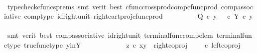 \begin{isabellebody}
\ \ \ \ \ \ \ \ \isamarkupfalse%
\ {\isacharparenleft}{\kern0pt}typecheck{\isacharunderscore}{\kern0pt}cfuncs{\isacharunderscore}{\kern0pt}prems{\isacharcomma}{\kern0pt}\ smt\ {\isacharparenleft}{\kern0pt}verit{\isacharcomma}{\kern0pt}\ best{\isacharparenright}{\kern0pt}\ cfunc{\isacharunderscore}{\kern0pt}cross{\isacharunderscore}{\kern0pt}prod{\isacharunderscore}{\kern0pt}comp{\isacharunderscore}{\kern0pt}cfunc{\isacharunderscore}{\kern0pt}prod\ comp{\isacharunderscore}{\kern0pt}associative{}\ comp{\isacharunderscore}{\kern0pt}type\ id{\isacharunderscore}{\kern0pt}right{\isacharunderscore}{\kern0pt}unit{}\ right{\isacharunderscore}{\kern0pt}cart{\isacharunderscore}{\kern0pt}proj{\isacharunderscore}{\kern0pt}cfunc{\isacharunderscore}{\kern0pt}prod{\isacharparenright}{\kern0pt}\isanewline
\ \ \ \ \ \ \isamarkupfalse%
\ \isamarkupfalse%
\ {\isachardoublequoteopen}Q\ {\isasymcirc}\isactrlsub c\ y\ {\isacharequal}{\kern0pt}\ {\isacharparenleft}{\kern0pt}{\isasymt}\ {\isasymcirc}\isactrlsub c\ {\isasymbeta}\isactrlbsub Y\isactrlesub {\isacharparenright}{\kern0pt}\ {\isasymcirc}\isactrlsub c\ y{\isachardoublequoteclose}\isanewline
\ \ \ \ \ \ \ \ \isamarkupfalse%
\ {\isacharparenleft}{\kern0pt}smt\ {\isacharparenleft}{\kern0pt}verit{\isacharcomma}{\kern0pt}\ best{\isacharparenright}{\kern0pt}\ comp{\isacharunderscore}{\kern0pt}associative{}\ id{\isacharunderscore}{\kern0pt}right{\isacharunderscore}{\kern0pt}unit{}\ terminal{\isacharunderscore}{\kern0pt}func{\isacharunderscore}{\kern0pt}comp{\isacharunderscore}{\kern0pt}elem\ terminal{\isacharunderscore}{\kern0pt}func{\isacharunderscore}{\kern0pt}type\ true{\isacharunderscore}{\kern0pt}func{\isacharunderscore}{\kern0pt}type\ y{\isacharunderscore}{\kern0pt}in{\isacharunderscore}{\kern0pt}Y{\isacharparenright}{\kern0pt}\isanewline
\ \ \ \ \isamarkupfalse%
\isanewline
\ \ \ \ \ \ \isamarkupfalse%
\ {\isachardoublequoteopen}z\ {\isasymcirc}\isactrlsub c\ {\isasymlangle}x{\isacharcomma}{\kern0pt}y{\isasymrangle}\ {\isacharequal}{\kern0pt}\ right{\isacharunderscore}{\kern0pt}coproj\ {\isasymone}\ {\isacharparenleft}{\kern0pt}{\isasymone}\ {\isasymCoprod}\ {\isasymone}{\isacharparenright}{\kern0pt}\ {\isasymcirc}\isactrlsub c\ left{\isacharunderscore}{\kern0pt}coproj\ {\isasymone}\ {\isasymone}{\isachardoublequoteclose}\isanewline
\ \ \ \ \ \ \isamarkupfalse%
\ \isamarkupfalse%

\end{isabellebody}
